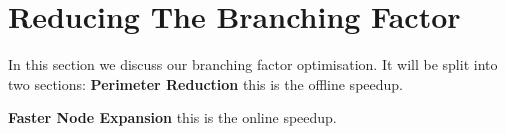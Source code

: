 \section{Reducing The Branching Factor}
In this section we discuss our branching factor optimisation.
It will be split into two sections:
\textbf{Perimeter Reduction} this is the offline speedup. 
\par
\textbf{Faster Node Expansion} this is the online speedup.
